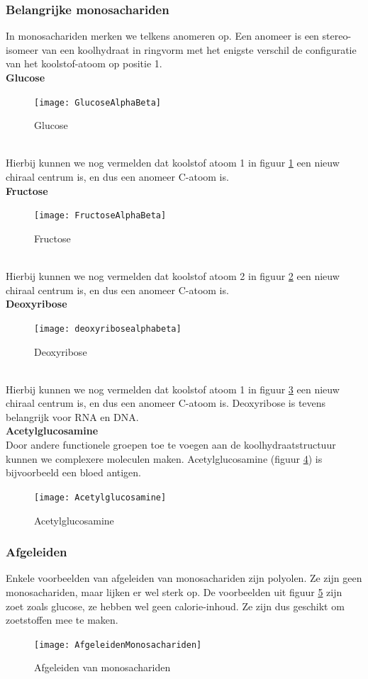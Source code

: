 \documentclass[a4paper,kul]{kulakarticle} %
\begin{document}
\subsubsection{Belangrijke monosachariden}
In monosachariden merken we telkens anomeren op. Een anomeer is een stereo-isomeer van een koolhydraat in ringvorm met het enigste verschil de configuratie van het koolstof-atoom op positie 1. \\
\textbf{Glucose}
\begin{figure}[h]
	\centering
	\texttt{[image: GlucoseAlphaBeta]}
	\caption[Glucose]{Glucose}
	\label{fig:glucosealphabeta}
\end{figure}\\
Hierbij kunnen we nog vermelden dat koolstof atoom 1 in figuur \ref{fig:glucosealphabeta} een nieuw chiraal centrum is, en dus een anomeer C-atoom is.\\
\textbf{Fructose}
\begin{figure}[h]
	\centering
	\texttt{[image: FructoseAlphaBeta]}
	\caption[Fructose]{Fructose}
	\label{fig:fructosealphabeta}
\end{figure}\\
Hierbij kunnen we nog vermelden dat koolstof atoom 2 in figuur \ref{fig:fructosealphabeta} een nieuw chiraal centrum is, en dus een anomeer C-atoom is.\\
\newpage
\textbf{Deoxyribose}
\begin{figure}[h]
	\centering
	\texttt{[image: deoxyribosealphabeta]}
	\caption[Deoxyribose]{Deoxyribose}
	\label{fig:deoxyribosealphabeta}
\end{figure}\\
Hierbij kunnen we nog vermelden dat koolstof atoom 1 in figuur \ref{fig:deoxyribosealphabeta} een nieuw chiraal centrum is, en dus een anomeer C-atoom is. Deoxyribose is tevens belangrijk voor RNA en DNA.\\
\textbf{Acetylglucosamine}\\
Door andere functionele groepen toe te voegen aan de koolhydraatstructuur kunnen we complexere moleculen maken. Acetylglucosamine (figuur \ref{fig:acetylglucosamine}) is bijvoorbeeld een bloed antigen.
\begin{figure}[h]
	\centering
	\texttt{[image: Acetylglucosamine]}
	\caption[Acetylglucosamine]{Acetylglucosamine}
	\label{fig:acetylglucosamine}
\end{figure}
\subsubsection{Afgeleiden}
Enkele voorbeelden van afgeleiden van monosachariden zijn polyolen. Ze zijn geen monosachariden, maar lijken er wel sterk op. De voorbeelden uit figuur \ref{fig:afgeleidenmonosachariden} zijn zoet zoals glucose, ze hebben wel geen calorie-inhoud. Ze zijn dus geschikt om zoetstoffen mee te maken.
\begin{figure}[h]
	\centering
	\texttt{[image: AfgeleidenMonosachariden]}
	\caption[Afgeleiden]{Afgeleiden van monosachariden}
	\label{fig:afgeleidenmonosachariden}
\end{figure}
\end{document}
